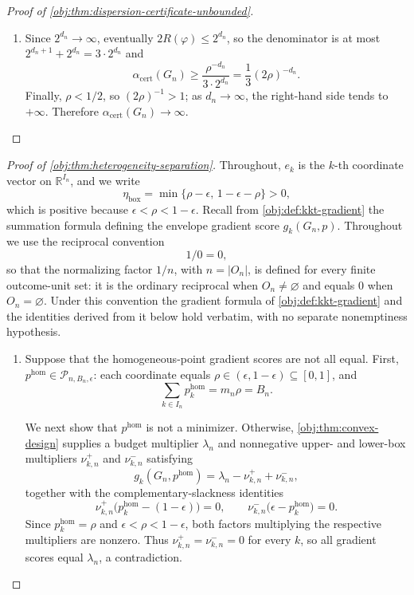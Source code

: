 \begin{proof}[Proof of \cref{obj:thm:dispersion-certificate-unbounded}]
\begin{enumerate}
\item Since \(2^{d_n}\to\infty\), eventually
\(2R(\varphi)\leq2^{d_n}\), so the denominator is at most \(2^{d_n+1}+2^{d_n}=3\cdot2^{d_n}\) and
\[
\alpha_{\mathrm{cert}}(G_n)\geq
\frac{\rho^{-d_n}}{3\cdot2^{d_n}}
=\frac13(2\rho)^{-d_n}.
\]
Finally, \(\rho<1/2\), so \((2\rho)^{-1}>1\); as \(d_n\to\infty\), the
right-hand side tends to \(+\infty\).  Therefore
\(\alpha_{\mathrm{cert}}(G_n)\to\infty\).
\end{enumerate}
\end{proof}

\begin{proof}[Proof of \cref{obj:thm:heterogeneity-separation}]
Throughout, \(e_k\) is the \(k\)-th coordinate vector on \(\mathbb R^{I_n}\), and we write
\[
\eta_{\mathrm{box}}=\min\{\rho-\epsilon,\,1-\epsilon-\rho\}>0,
\]
which is positive because \(\epsilon<\rho<1-\epsilon\).  Recall from \cref{obj:def:kkt-gradient} the summation formula defining the envelope gradient score \(g_k(G_n,p)\).  Throughout we use the reciprocal convention
\[
1/0=0,
\]
so that the normalizing factor \(1/n\), with \(n=\lvert O_n\rvert\), is defined for every finite outcome-unit set: it is the ordinary reciprocal when \(O_n\neq\varnothing\) and equals \(0\) when \(O_n=\varnothing\).  Under this convention the gradient formula of \cref{obj:def:kkt-gradient} and the identities derived from it below hold verbatim, with no separate nonemptiness hypothesis.

\begin{enumerate}
\item Suppose that the homogeneous-point gradient scores are not all equal.  First, \(p^{\mathrm{hom}}\in\mathcal P_{n,B_n,\epsilon}\): each coordinate equals \(\rho\in(\epsilon,1-\epsilon)\subseteq[0,1]\), and
\[
\sum_{k\in I_n}p^{\mathrm{hom}}_k=m_n\rho=B_n.
\]

We next show that \(p^{\mathrm{hom}}\) is not a minimizer.  Otherwise, \cref{obj:thm:convex-design} supplies a budget multiplier \(\lambda_n\) and nonnegative upper- and lower-box multipliers \(\nu^+_{k,n}\) and \(\nu^-_{k,n}\) satisfying
\[
g_k(G_n,p^{\mathrm{hom}})
=\lambda_n-\nu^+_{k,n}+\nu^-_{k,n},
\]
together with the complementary-slackness identities
\[
\nu^+_{k,n}\bigl(p^{\mathrm{hom}}_k-(1-\epsilon)\bigr)=0,
\qquad
\nu^-_{k,n}\bigl(\epsilon-p^{\mathrm{hom}}_k\bigr)=0.
\]
Since \(p^{\mathrm{hom}}_k=\rho\) and \(\epsilon<\rho<1-\epsilon\), both factors multiplying the respective multipliers are nonzero.  Thus \(\nu^+_{k,n}=\nu^-_{k,n}=0\) for every \(k\), so all gradient scores equal \(\lambda_n\), a contradiction.


\end{enumerate}
\end{proof}
